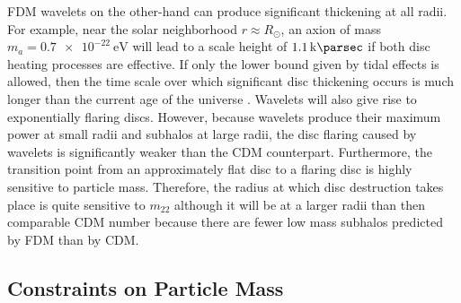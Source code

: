 \documentclass[usenatbib]{mnras}
\begin{document}
FDM wavelets on the other-hand can produce significant thickening at all radii. For example, near the solar neighborhood $r \approx R_{\odot}$, an axion of mass $m_a = \SI{0.7 e-22}{\electronvolt}$ will lead to a scale height of $\SI{1.1}{\kilo\parsec}$ if both disc heating processes are effective. If only the lower bound given by tidal effects is allowed, then the time scale over which significant disc thickening occurs is much longer than the current age of the universe \citep{ultralight}. Wavelets will also give rise to exponentially flaring discs. However, because wavelets produce their maximum power at small radii and subhalos at large radii, the disc flaring caused by wavelets is significantly weaker than the CDM counterpart. Furthermore, the transition point from an approximately flat disc to a flaring disc is highly sensitive to particle mass. Therefore, the radius at which disc destruction takes place is quite sensitive to $m_{22}$ although it will be at a larger radii than then comparable CDM number because there are fewer low mass subhalos predicted by FDM than by CDM. 


\subsection{Constraints on Particle Mass}
\end{document}
